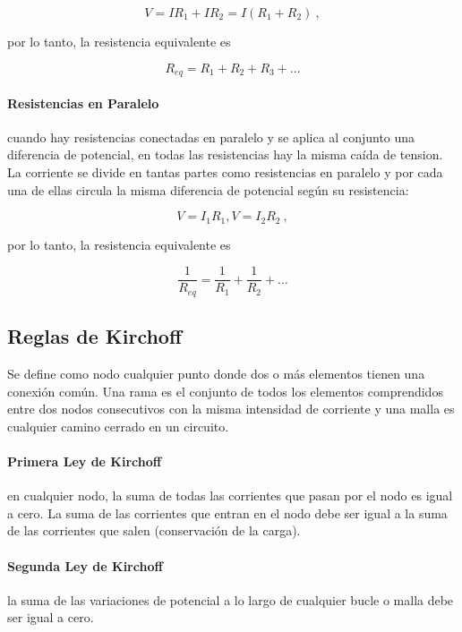 \documentclass{tufte-handout}
\begin{document}
\begin{equation}
V = IR_1 + IR_2 = I(R_1 + R_2)~,
\end{equation}

por lo tanto, la resistencia equivalente es

\begin{equation}
R_{eq} = R_1 + R_2 + R_3 + \dots
\end{equation}

\paragraph{Resistencias en Paralelo} cuando hay resistencias conectadas en paralelo y se aplica al conjunto una diferencia de potencial, en todas las resistencias hay la misma caída de tension. La corriente se divide en tantas partes como resistencias en paralelo y por cada una de ellas circula la misma diferencia de potencial según su resistencia:

\begin{equation}
V = I_1R_1, V = I_2R_2~,
\end{equation}

por lo tanto, la resistencia equivalente es

\begin{equation}
\frac{1}{R_{eq}} = \frac{1}{R_1} + \frac{1}{R_2} + \dots
\end{equation}

\subsection{Reglas de Kirchoff}

Se define como nodo cualquier punto donde dos o más elementos tienen una conexión común. Una rama es el conjunto de todos los elementos comprendidos entre dos nodos consecutivos con la misma intensidad de corriente y una malla es cualquier camino cerrado en un circuito.

\paragraph{Primera Ley de Kirchoff} en cualquier nodo, la suma de todas las corrientes que pasan por el nodo es igual a cero. La suma de las corrientes que entran en el nodo debe ser igual a la suma de las corrientes que salen (conservación de la carga).

\paragraph{Segunda Ley de Kirchoff} la suma de las variaciones de potencial a lo largo de cualquier bucle o malla debe ser igual a cero.
\end{document}
